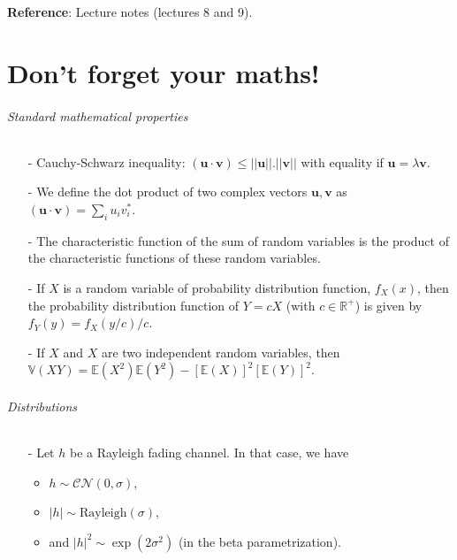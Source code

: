 \documentclass [a4paper, 11pt] {article}
\begin{document}
\begin{reminder}
    \textbf{Reference}: Lecture notes (lectures 8 and 9).
    
    \pagebreak
    \part*{Don't forget your maths!}

\paragraph{Standard mathematical properties}

\begin{itemize}
\item[-] Cauchy-Schwarz inequality: $(\mathbf{u} \cdot\mathbf{v}) \leq ||\mathbf{u}||.||\mathbf{v}||$ with equality if $\mathbf{u} = \lambda \mathbf{v}$.

\item[-] We define the dot product of two complex vectors $\mathbf{u},\mathbf{v}$ as $(\mathbf{u} \cdot\mathbf{v}) = \sum_i u_iv_i^*$.

\item[-] The characteristic function of the sum of random variables is the product of the characteristic functions of these random variables.

\item[-] If $X$ is a random variable of probability distribution function, $f_X(x)$, then the probability distribution function of $Y=cX$ (with $c \in \mathbb{R}^+$) is given by $f_Y(y) = f_X(y/c)/c$.

\item[-] If $X$ and $X$ are two independent random variables, then $\mathbb{V}(XY)= \mathbb{E}(X^2) \mathbb{E}(Y^2) - [\mathbb{E}(X)]^2 [\mathbb{E}(Y)]^2$.
\end{itemize}


\paragraph{Distributions}

\begin{itemize}
\item[-] Let $h$ be a Rayleigh fading channel. In that case, we have 
    \begin{itemize}
        \item $h \sim \mathcal{C}\mathcal{N}(0,\sigma)$,
        \item $|h| \sim \text{Rayleigh}(\sigma)$,
        \item and $|h|^2 \sim \exp(2\sigma^2)$ (in the beta parametrization). 
    \end{itemize}
    

\end{itemize}
\end{reminder}
\end{document}
